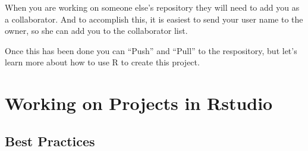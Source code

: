 \documentclass[12pt]{../SOP4_alpha}\usepackage[]{graphicx}\usepackage[]{xcolor}
\begin{document}
\NP When you are working on someone else's repository they will need to add you as a collaborator. And to accomplish this, it is easiest to send your user name to the owner, so she can add you to the collaborator list.  

\NP Once this has been done you can ``Push'' and ``Pull'' to the respository, but let's learn more about how to use R to create this project. 


\section{Working on Projects in Rstudio}

\subsection{Best Practices}
\end{document}
